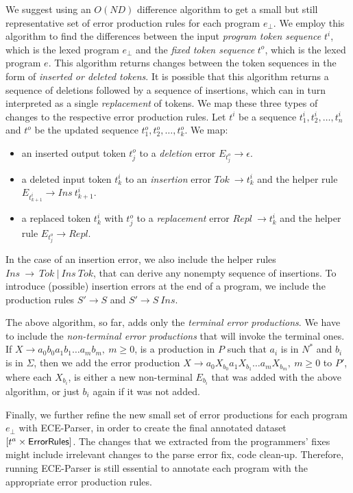 We suggest using an $O(ND)$ difference algorithm to get a small but still
representative set of error production rules for each program $e_{\bot}$. We
employ this algorithm to find the differences between the input
\emph{program token sequence} $t^i$, which is the lexed program $e_{\bot}$ and
the \emph{fixed token sequence} $t^o$, which is the lexed program $e$. This
algorithm returns changes between the token sequences in the form of
\emph{inserted or deleted tokens}. It is possible that this algorithm returns a
sequence of deletions followed by a sequence of insertions, which can in turn
interpreted as a single \emph{replacement} of tokens. We map these three types
of changes to the respective error production rules. Let $t^i$ be a sequence
$t^i_1, t^i_2, \dots, t^i_n$ and $t^o$ be the updated sequence $t^o_1, t^o_2,
\dots, t^o_k$. We map:
\begin{itemize}
    \item an inserted output token $t^o_j$ to a \emph{deletion} error $E_{t^o_j}
    \rightarrow \epsilon$.
    \item a deleted input token $t^i_k$ to an \emph{insertion} error $Tok\
    \rightarrow t^i_k$ and the helper rule $E_{t^i_{k+1}} \rightarrow Ins\
    t^i_{k+1}$.
    \item a replaced token $t^i_k$ with $t^o_j$ to a \emph{replacement} error
    $Repl\ \rightarrow t^i_k$ and the helper rule $E_{t^o_j} \rightarrow Repl$.
\end{itemize}

In the case of an insertion error, we also include the helper rules $Ins\
\rightarrow\ Tok\ \vert\ Ins\ Tok$, that can derive any nonempty sequence of
insertions. To introduce (possible) insertion errors at the end of a program, we
include the production rules $S' \rightarrow S$ and $S' \rightarrow S\ Ins$.

The above algorithm, so far, adds only the \emph{terminal error productions}. We
have to include the \emph{non-terminal error productions} that will invoke the
terminal ones. If $X \rightarrow a_0b_0a_1b_1 \dots a_mb_m,\ m \geq 0$, is a
production in $P$ such that $a_i$ is in $N^*$ and $b_i$ is in $\Sigma$, then we
add the error production $X \rightarrow a_0X_{b_0}a_1X_{b_1} \dots a_mX_{b_m},\
m \geq 0$ to $P'$, where each $X_{b_i}$, is either a new non-terminal $E_{b_i}$
that was added with the above algorithm, or just $b_i$ again if it was not
added.

Finally, we further refine the new small set of error productions for each
program $e_{\bot}$ with ECE-Parser, in order to create the final annotated
dataset $[t^a \times \mathsf{ErrorRules}]$. The changes that we extracted from
the programmers' fixes might include irrelevant changes to the parse error fix,
\eg code clean-up. Therefore, running ECE-Parser is still essential to annotate
each program with the appropriate error production rules.



